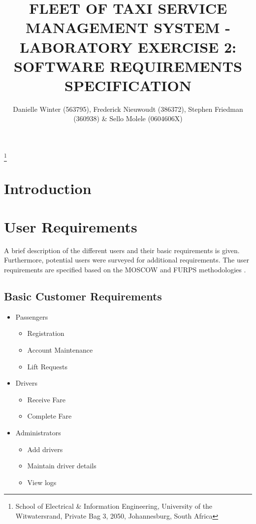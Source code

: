 \documentclass[10pt,twocolumn]{witseiepaper}
\begin{document}
\title{FLEET OF TAXI SERVICE MANAGEMENT SYSTEM - LABORATORY EXERCISE 2: SOFTWARE REQUIREMENTS SPECIFICATION}

\author{Danielle Winter (563795), Frederick Nieuwoudt (386372), Stephen Friedman (360938) \& Sello Molele (0604606X)}
\thanks{School of Electrical \& Information Engineering, University of the
Witwatersrand, Private Bag 3, 2050, Johannesburg, South Africa}


%

\maketitle
\thispagestyle{empty}\pagestyle{empty}


%
\section{Introduction}

\section{User Requirements}
A brief description of the different users and their basic requirements is given. Furthermore, potential users were surveyed for additional requirements. The user requirements are specified based on the MOSCOW and FURPS methodologies \cite{SoftwareEngTextbook}.

\subsection{Basic Customer Requirements}
\begin{itemize}
\item Passengers
\begin{itemize}
\item Registration
\item Account Maintenance
\item Lift Requests
\end{itemize}
\item Drivers
\begin{itemize}
\item Receive Fare
\item Complete Fare
\end{itemize}
\item Administrators
\begin{itemize}
\item Add drivers
\item Maintain driver details
\item View logs
\end{itemize}
\end{itemize}
\end{document}
